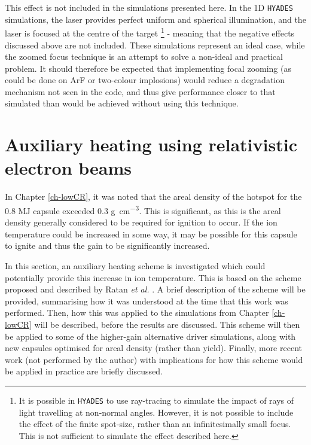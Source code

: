 This effect is not included in the simulations presented here. In the 1D \texttt{HYADES} simulations, the laser provides perfect uniform and spherical illumination, and the laser is focused at the centre of the target \footnote{It is possible in \texttt{HYADES} to use ray-tracing to simulate the impact of rays of light travelling at non-normal angles. However, it is not possible to include the effect of the finite spot-size, rather than an infinitesimally small focus. This is not sufficient to simulate the effect described here.} - meaning that the negative effects discussed above are not included. These simulations represent an ideal case, while the zoomed focus technique is an attempt to solve a non-ideal and practical problem. It should therefore be expected that implementing focal zooming (as could be done on ArF or two-colour implosions) would reduce a degradation mechanism not seen in the code, and thus give performance closer to that simulated than would be achieved without using this technique.

\section{Auxiliary heating using relativistic electron beams} \label{sec:AuxiliaryHeating}

In Chapter \ref{ch-lowCR}, it was noted that the areal density of the hotspot for the 0.8 MJ capsule exceeded 0.3 \unit{\gram\per\centi\meter\cubed}. This is significant, as this is the areal density generally considered to be required for ignition to occur. If the ion temperature could be increased in some way, it may be possible for this capsule to ignite and thus the gain to be significantly increased.

In this section, an auxiliary heating scheme is investigated which could potentially provide this increase in ion temperature. This is based on the scheme proposed and described by Ratan \textit{et al.} \cite{Ratan2017}. A brief description of the scheme will be provided, summarising how it was understood at the time that this work was performed. Then, how this was applied to the simulations from Chapter \ref{ch-lowCR} will be described, before the results are discussed. This scheme will then be applied to some of the higher-gain alternative driver simulations, along with new capsules optimised for areal density (rather than yield). Finally, more recent work (not performed by the author) with implications for how this scheme would be applied in practice are briefly discussed.

